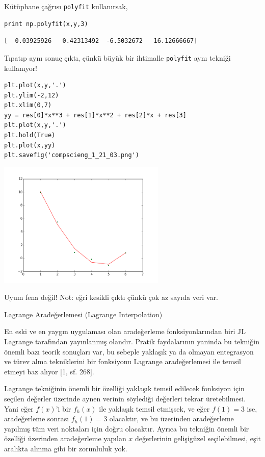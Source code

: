 \documentclass[12pt,fleqn]{article}\usepackage{../../common}
\begin{document}
Kütüphane çağrısı \verb!polyfit! kullanırsak,

\begin{verbatim}
print np.polyfit(x,y,3)
\end{verbatim}

\begin{verbatim}
[  0.03925926   0.42313492  -6.5032672   16.12666667]
\end{verbatim}

Tıpatıp aynı sonuç çıktı, çünkü büyük bir ihtimalle \verb!polyfit! aynı
tekniği kullanıyor! 

\begin{verbatim}
plt.plot(x,y,'.')
plt.ylim(-2,12)
plt.xlim(0,7)
yy = res[0]*x**3 + res[1]*x**2 + res[2]*x + res[3]
plt.plot(x,y,'.')
plt.hold(True)
plt.plot(x,yy)
plt.savefig('compscieng_1_21_03.png')
\end{verbatim}

\includegraphics[height=6cm]{compscieng_1_21_03.png}

Uyum fena değil! Not: eğri kesikli çıktı çünkü çok az sayıda veri var. 


Lagrange Aradeğerlemesi (Lagrange Interpolation)

En eski ve en yaygın uygulaması olan aradeğerleme fonksiyonlarından biri JL
Lagrange tarafından yayınlanmış olandır. Pratik faydalarının yaninda bu tekniğin
önemli bazı teorik sonuçları var, bu sebeple yaklaşık ya da olmayan entegrasyon
ve türev alma tekniklerini bir fonksiyonu Lagrange aradeğerlemesi ile temsil
etmeyi baz alıyor [1, sf. 268].

Lagrange tekniğinin önemli bir özelliği yaklaşık temsil edilecek fonksiyon için
seçilen değerler üzerinde aynen verinin söylediği değerleri tekrar
üretebilmesi. Yani eğer $f(x)$'i bir $f_h(x)$ ile yaklaşık temsil etmişsek, ve
eğer $f(1) = 3$ ise, aradeğerleme sonrası $f_h(1) = 3$ olacaktır, ve bu
üzerinden aradeğerleme yapılmış tüm veri noktaları için doğru olacaktır.
Ayrıca bu tekniğin önemli bir özelliği üzerinden aradeğerleme yapılan $x$
değerlerinin gelişigüzel seçilebilmesi, eşit aralıkta alınma gibi bir
zorunluluk yok.
\end{document}
